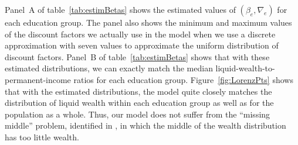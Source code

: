 \documentclass[\econtexRoot/HAFiscal]{subfiles}
\begin{document}
Panel~A of table~\ref{tab:estimBetas} shows the estimated values of $(\beta_e, \nabla_e)$ for each education group. The panel also shows the minimum and maximum values of the discount factors we actually use in the model when we use a discrete approximation with seven values to approximate the uniform distribution of discount factors. Panel~B of table~\ref{tab:estimBetas} shows that with these estimated distributions, we can exactly match the median liquid-wealth-to-permanent-income ratios for each education group. Figure~\ref{fig:LorenzPts} shows that with the estimated distributions, the model quite closely matches the distribution of liquid wealth within each education group as well as for the population as a whole. Thus, our model does not suffer from the ``missing middle'' problem, identified in \cite{kaplanMPC2022}, in which the middle of the wealth distribution has too little wealth.  
\end{document}
